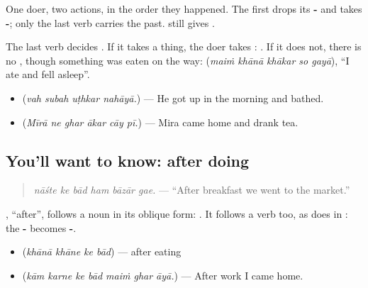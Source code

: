 One doer, two actions, in the order they happened. The first drops its \textbf{-} and takes \textbf{-}; only the last verb carries the past. \textbf{} still gives \textbf{}.

The last verb decides \textbf{}. If it takes a thing, the doer takes \textbf{}: \textbf{    }. If it does not, there is no \textbf{}, though something was eaten on the way: \textbf{    } (\emph{maiṁ khānā khākar so gayā}), \textquotedblleft{}I ate and fell asleep\textquotedblright{}.

\begin{itemize}
\raggedright
  \item \textbf{   } (\emph{vah subah uṭhkar nahāyā.}) — He got up in the morning and bathed.
  \item \textbf{     } (\emph{Mīrā ne ghar ākar cāy pī.}) — Mira came home and drank tea.
\end{itemize}

\subsection*{You'll want to know: after doing}
\begin{quote}
\textbf{     }
\end{quote}

\begin{quote}
\emph{nāśte ke bād ham bāzār gae.} — \textquotedblleft{}After breakfast we went to the market.\textquotedblright{}
\end{quote}

\textbf{ }, \textquotedblleft{}after\textquotedblright{}, follows a noun in its oblique form: \textbf{  }. It follows a verb too, as \textbf{ } does in \textbf{  }: the \textbf{-} becomes \textbf{-}.

\begin{itemize}
\raggedright
  \item \textbf{   } (\emph{khānā khāne ke bād}) — after eating
  \item \textbf{      } (\emph{kām karne ke bād maiṁ ghar āyā.}) — After work I came home.
\end{itemize}

